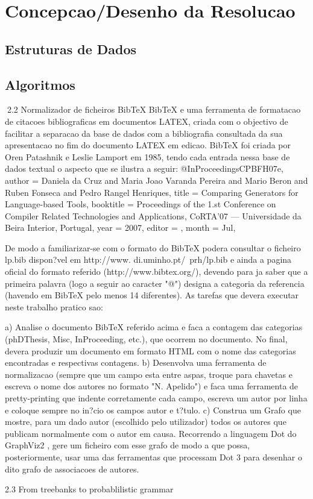 \chapter{Concepcao/Desenho da Resolucao}
\section{Estruturas de Dados}
\section{Algoritmos}

2.2    Normalizador de ficheiros BibTeX
BibTeX e uma ferramenta de formatacao de citacoes bibliograficas em documentos LATEX, criada com o objectivo de
facilitar a separacao da base de dados com a bibliografia consultada da sua apresentacao no fim do documento LATEX
em edicao. BibTeX foi criada por Oren Patashnik e Leslie Lamport em 1985, tendo cada entrada nessa base de dados
textual o aspecto que se ilustra a seguir:
@InProceedings{CPBFH07e,
  author =    {Daniela da Cruz and Maria Joao Varanda Pereira
               and Mario Beron and Ruben Fonseca and
               Pedro Rangel Henriques},
  title =     {Comparing Generators for Language-based Tools},
  booktitle = {Proceedings of the 1.st Conference on Compiler
               Related Technologies and Applications, CoRTA'07
               --- Universidade da Beira Interior, Portugal},
  year =      {2007},
  editor =    {},
  month =     {Jul},
}

De modo a familiarizar-se com o formato do BibTeX podera consultar o ficheiro lp.bib dispon?vel em http://www.
di.uminho.pt/~prh/lp.bib e ainda a pagina oficial do formato referido (http://www.bibtex.org/), devendo para
ja saber que a primeira palavra (logo a seguir ao caracter "@") designa a categoria da referencia (havendo em BibTeX
pelo menos 14 diferentes).
As tarefas que devera executar neste trabalho pratico sao:

a) Analise o documento BibTeX referido acima e faca a contagem das categorias (phDThesis, Misc, InProceeding,
    etc.), que ocorrem no documento. No final, devera produzir um documento em formato HTML com o nome das
    categorias encontradas e respectivas contagens.
b) Desenvolva uma ferramenta de normalizacao (sempre que um campo esta entre aspas, troque para chavetas e
    escreva o nome dos autores no formato "N. Apelido") e faca uma ferramenta de pretty-printing que indente
    corretamente cada campo, escreva um autor por linha e coloque sempre no in?cio os campos autor e t?tulo.
c) Construa um Grafo que mostre, para um dado autor (escolhido pelo utilizador) todos os autores que publicam
     normalmente com o autor em causa.
     Recorrendo a linguagem Dot do GraphViz2 , gere um ficheiro com esse grafo de modo a que possa, posteriormente,
     usar uma das ferramentas que processam Dot 3 para desenhar o dito grafo de associacoes de autores.

2.3    From treebanks to probablilistic grammar
